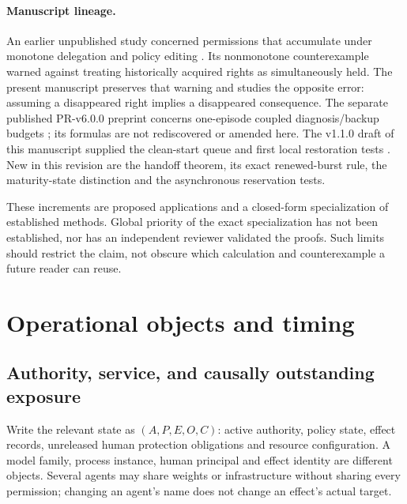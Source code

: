 \documentclass[11pt,a4paper]{article}
\theoremstyle{definition}\newtheorem{definition}{Definition}
\begin{document}
\paragraph{Manuscript lineage.}
An earlier unpublished study concerned permissions that accumulate under monotone delegation and policy editing \cite{guardians}. Its nonmonotone counterexample warned against treating historically acquired rights as simultaneously held. The present manuscript preserves that warning and studies the opposite error: assuming a disappeared right implies a disappeared consequence. The separate published PR-v6.0.0 preprint concerns one-episode coupled diagnosis/backup budgets \cite{pr6}; its formulas are not rediscovered or amended here. The v1.1.0 draft of this manuscript supplied the clean-start queue and first local restoration tests \cite{draft}. New in this revision are the handoff theorem, its exact renewed-burst rule, the maturity-state distinction and the asynchronous reservation tests.

These increments are proposed applications and a closed-form specialization of established methods. Global priority of the exact specialization has not been established, nor has an independent reviewer validated the proofs. Such limits should restrict the claim, not obscure which calculation and counterexample a future reader can reuse.

\section{Operational objects and timing}
\label{sec:model}
\subsection{Authority, service, and causally outstanding exposure}
Write the relevant state as $(A,P,E,O,C)$: active authority, policy state, effect records, unreleased human protection obligations and resource configuration. A model family, process instance, human principal and effect identity are different objects. Several agents may share weights or infrastructure without sharing every permission; changing an agent's name does not change an effect's actual target.
\end{document}
